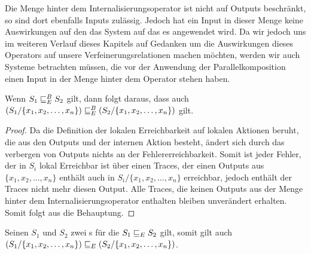 Die Menge hinter dem Internalisierungsoperator ist nicht auf Outputs
beschränkt, so sind dort ebenfalls Inputs zulässig. Jedoch hat ein Input in
dieser Menge keine Auswirkungen auf den das System auf das es angewendet wird.
Da wir jedoch uns im weiteren Verlauf dieses Kapitels auf Gedanken um die
Auswirkungen dieses Operators auf unsere Verfeinerungsrelationen machen
möchten, werden wir auch Systeme betrachten müssen, die vor der Anwendung der
Parallelkomposition einen Input in der Menge hinter dem Operator stehen haben.

\begin{prop}
  Wenn $S_1\sqsubseteq _E^B S_2$ gilt, dann folgt daraus, dass auch $(S_1/\{x_1,x_2,\dots
  ,x_n\})\sqsubseteq _E^B (S_2/\{x_1,x_2,\dots ,x_n\})$ gilt.
\end{prop}

\begin{proof}
  Da die Definition der lokalen Erreichbarkeit auf lokalen Aktionen beruht, die
  aus den Outputs und der internen Aktion besteht, ändert sich durch das
  verbergen von Outputs nichts an der Fehlererreichbarkeit. Somit ist jeder
  Fehler, der in $S_i$ lokal Erreichbar ist über einen Traces, der einen
  Outputs aus $\{x_1,x_2,\dots ,x_n\}$ enthält auch in $S_i/\{x_1,x_2,\dots
  ,x_n\}$ erreichbar, jedoch enthält der Traces nicht mehr diesen Output. Alle
  Traces, die keinen Outputs aus der Menge hinter dem Internalisierungsoperator
  enthalten bleiben unverändert erhalten. Somit folgt aus die Behauptung.
\end{proof}

\begin{satz}
  Seinen $S_1$ und $S_2$ zwei \EIO{}s für die $S_1\sqsubseteq _E S_2$ gilt, somit gilt
  auch $(S_1/\{x_1,x_2,\dots ,x_n\})\sqsubseteq _E (S_2/\{x_1,x_2,\dots ,x_n\})$.
\end{satz}

